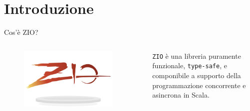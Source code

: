 \section{Introduzione}
\begin{frame}{Cos'è ZIO?}
  \begin{columns}
    \begin{column}{.5\textwidth}
      \begin{figure}
        \centering
        \includegraphics[width=0.9\textwidth]{img/zio-logo.jpg}
        \label{ZIO logo.}
      \end{figure}
    \end{column}
    \begin{column}{.5\textwidth}
      \begin{center} 
        \texttt{ZIO} è una libreria puramente funzionale, \texttt{type-safe}, e componibile a supporto della programmazione concorrente e asincrona in Scala.
      \end{center}
    \end{column}
  \end{columns}
\end{frame}
%
